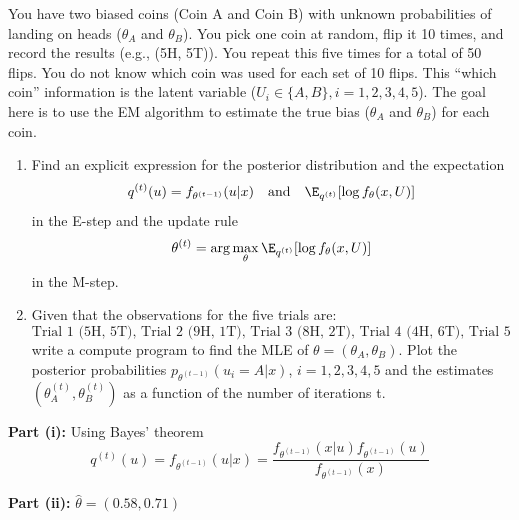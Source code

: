 \documentclass{article}
\begin{document}
\begin{homeworkProblem}
  You have two biased coins (Coin A and Coin B) with unknown
  probabilities of landing on heads ($\theta_A$ and $\theta_B$). You pick one coin at random, flip it 10 times, and
  record the results (e.g., (5H, 5T)). You repeat this five times for a total of 50 flips. You do not know
  which coin was used for each set of 10 flips. This “which coin” information is the latent variable
  ($U_i \in \{A, B\}, i = 1, 2, 3, 4, 5$). The goal here is to use the EM algorithm to estimate the true bias
  ($\theta_A$ and $\theta_B$) for each coin.
  \begin{enumerate}[label=(\roman*), topsep=5pt, itemsep=5pt]
    \item Find an explicit expression for the posterior distribution and the expectation
          \[
            q^{(t)} (u) = f_{\theta^{(t-1)}} (u|x) \quad\text{and}\quad \E_{q^{(t)}} [\log f_\theta(x, U)]
          \]
          in the E-step and the update rule
          \[
            \theta^{(t)} = \arg\max_{\theta} \E_{q^{(t)}} [\log f_\theta(x, U)]
          \]
          in the M-step.
    \item Given that the observations for the five trials are:
          \[
            \text{Trial 1 (5H, 5T), Trial 2 (9H, 1T), Trial 3 (8H, 2T), Trial 4 (4H, 6T), Trial 5 (7H, 3T),}
          \]
          write a compute program to find the MLE of $\theta = (\theta_A, \theta_B)$. Plot the posterior probabilities
          $p_{\theta^{(t-1)}}(u_i = A|x)$, $i = 1, 2, 3, 4, 5$ and the estimates $(\theta_A^{(t)}, \theta_B^{(t)})$ as a function of the number
          of iterations t. \newline
  \end{enumerate}
  \solution

  \textbf{Part (i):} Using Bayes’ theorem
  \[
    q^{(t)} (u) = f_{\theta^{(t-1)}} (u|x) = \frac{f_{\theta^{(t-1)}} (x|u) f_{\theta^{(t-1)}} (u)}{f_{\theta^{(t-1)}} (x)}
  \]

  \textbf{Part (ii):} $\hat{\theta} = (0.58, 0.71)$


\end{homeworkProblem}
\end{document}

